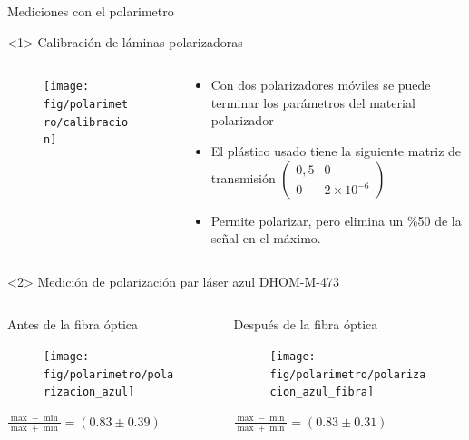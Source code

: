 \begin{frame}{Mediciones con el polarimetro}
    \begin{onlyenv}<1>
        Calibración de láminas polarizadoras
        \begin{columns}
            \begin{column}{0.5\textwidth}
                \begin{figure}[H]
                \centering
                \texttt{[image: fig/polarimetro/calibracion]}
                \label{fig:polarimetro_calibracion}
            \end{figure}
            \end{column}
            \begin{column}{0.5\textwidth}
                \begin{itemize}
                    \item Con dos polarizadores móviles se puede terminar los parámetros del material polarizador
                    \item El plástico usado tiene la siguiente matriz de transmisión $\begin{pmatrix} 0,5 & 0 \\ 0 & 2\times 10^{-6} \end{pmatrix}$
                    \item Permite polarizar, pero elimina un \%50 de la señal en el máximo.
                \end{itemize}
            \end{column}
        \end{columns}
    \end{onlyenv}
    \begin{onlyenv}<2>
        Medición de polarización par láser azul DHOM-M-473  
        \begin{columns}
            \begin{column}{0.5\textwidth}
                Antes de la fibra óptica
                \begin{figure}[H]
                    \centering
                    \texttt{[image: fig/polarimetro/polarizacion\_azul]}
                    \label{fig:polarimetro_calibracion}
                \end{figure}
                $\frac{\max - \min}{\max + \min} = (0.83 \pm 0.39)$
            \end{column}
            \begin{column}{0.5\textwidth}
            
                Después de la fibra óptica
                \begin{figure}[H]
                    \centering
                    \texttt{[image: fig/polarimetro/polarizacion\_azul\_fibra]}
                    \label{fig:polarimetro_calibracion}
                \end{figure}
                $\frac{\max - \min}{\max + \min} = (0.83 \pm 0.31)$
            \end{column}
        \end{columns}
    \end{onlyenv}
\end{frame}

